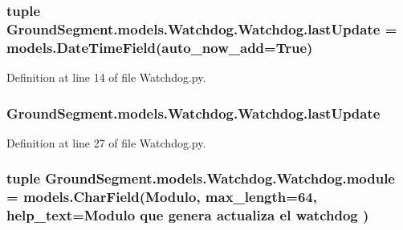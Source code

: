 \subsubsection[{last\+Update}]{\setlength{\rightskip}{0pt plus 5cm}tuple Ground\+Segment.\+models.\+Watchdog.\+Watchdog.\+last\+Update = models.\+Date\+Time\+Field(auto\+\_\+now\+\_\+add=True)\hspace{0.3cm}{\ttfamily [static]}}\label{class_ground_segment_1_1models_1_1_watchdog_1_1_watchdog_ac6ffa32a8b52ba04c20b99b0e4567bd5}


Definition at line 14 of file Watchdog.\+py.

\hypertarget{class_ground_segment_1_1models_1_1_watchdog_1_1_watchdog_a1c3ed2ac40ff216074da715ad3f5eb8a}{}
\subsubsection[{last\+Update}]{\setlength{\rightskip}{0pt plus 5cm}Ground\+Segment.\+models.\+Watchdog.\+Watchdog.\+last\+Update}\label{class_ground_segment_1_1models_1_1_watchdog_1_1_watchdog_a1c3ed2ac40ff216074da715ad3f5eb8a}


Definition at line 27 of file Watchdog.\+py.

\hypertarget{class_ground_segment_1_1models_1_1_watchdog_1_1_watchdog_ad2304bdf1d4275622b13386e224550a3}{}
\subsubsection[{module}]{\setlength{\rightskip}{0pt plus 5cm}tuple Ground\+Segment.\+models.\+Watchdog.\+Watchdog.\+module = models.\+Char\+Field(\textquotesingle{}Modulo\textquotesingle{}, max\+\_\+length=64, help\+\_\+text=\textquotesingle{}Modulo que genera actualiza el watchdog\textquotesingle{} )\hspace{0.3cm}{\ttfamily [static]}}\label{class_ground_segment_1_1models_1_1_watchdog_1_1_watchdog_ad2304bdf1d4275622b13386e224550a3}


